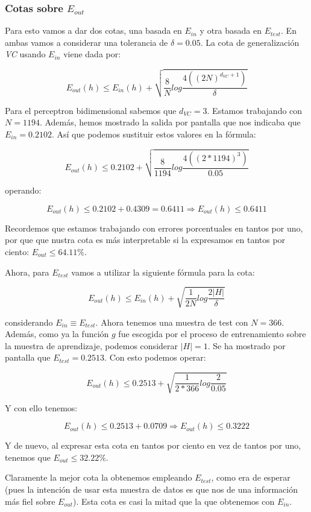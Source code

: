 \documentclass[11pt]{article}
\begin{document}
\subsubsection{Cotas sobre $E_{out}$}

Para esto vamos a dar dos cotas, una basada en $E_{in}$ y otra basada en $E_{test}$. En ambas vamos a considerar una tolerancia de $\delta = 0.05$. La cota de generalización \emph{VC} usando $E_{in}$ viene dada por:

$$E_{out}(h) \leq E_{in}(h) + \sqrt{\frac{8}{N} log\frac{4((2N)^{d_{VC} + 1})}{\delta}}$$

Para el perceptron bidimensional sabemos que $d_{VC} = 3$. Estamos trabajando con $N = 1194$. Además, hemos mostrado la salida por pantalla que nos indicaba que $E_{in} = 0.2102$. Así que podemos sustituir estos valores en la fórmula:

$$E_{out}(h) \leq 0.2102 + \sqrt{\frac{8}{1194} log\frac{4((2 * 1194)^{3})}{0.05}}$$

operando:

$$E_{out}(h) \leq 0.2102 + 0.4309 = 0.6411 \Rightarrow E_{out}(h) \leq 0.6411$$

Recordemos que estamos trabajando con errores porcentuales en tantos por uno, por que que nustra cota es más interpretable si la expresamos en tantos por ciento: $E_{out} \leq 64.11\%$.

Ahora, para $E_{test}$ vamos a utilizar la siguiente fórmula para la cota:

$$E_{out}(h) \leq E_{in}(h) + \sqrt{\frac{1}{2N} log\frac{2|H|}{\delta}}$$

considerando $E_{in} \equiv E_{test}$. Ahora tenemos una muestra de test con $N = 366$. Además, como ya la función $g$ fue escogida por el proceso de entrenamiento sobre la muestra de aprendizaje, podemos considerar $|H| = 1$. Se ha mostrado por pantalla que $E_{test} = 0.2513$. Con esto podemos operar:

$$E_{out}(h) \leq 0.2513 + \sqrt{\frac{1}{2 * 366} log\frac{2}{0.05}}$$

Y con ello tenemos:

$$E_{out}(h) \leq 0.2513 + 0.0709 \Rightarrow E_{out}(h) \leq 0.3222$$

Y de nuevo, al expresar esta cota en tantos por ciento en vez de tantos por uno, tenemos que $E_{out} \leq 32.22\%$.

Claramente la mejor cota la obtenemos empleando $E_{test}$, como era de esperar (pues la intención de usar esta muestra de datos es que nos de una información más fiel sobre $E_{out}$). Esta cota es casi la mitad que la que obtenemos con $E_{in}$.

\pagebreak
\end{document}
